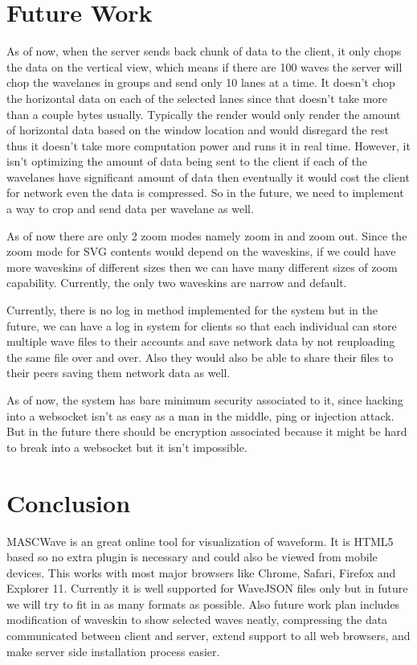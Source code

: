\documentclass[14pt]{extarticle}
\begin{document}
 \section{Future Work}
 \par As of now, when the server sends back chunk of data to the client, it only chops the data on the vertical view, which means if there are 100 waves the server will chop the wavelanes in groups and send only 10 lanes at a time. It doesn't chop the horizontal data on each of the selected lanes since that doesn't take more than a couple bytes usually. Typically the render would only render the amount of horizontal data based on the window location and would disregard the rest thus it doesn't take more computation power and runs it in real time. However, it isn't optimizing the amount of data being sent to the client if each of the wavelanes have significant amount of data then eventually it would cost the client for network even the data is compressed. So in the future, we need to implement a way to crop and send data per wavelane as well.
 \par As of now there are only 2 zoom modes namely zoom in and zoom out. Since the zoom mode for SVG contents would depend on the waveskins, if we could have more waveskins of different sizes then we can have many different sizes of zoom capability. Currently, the only two waveskins are narrow and default.
 \par Currently, there is no log in method implemented for the system but in the future, we can have a log in system for clients so that each individual can store multiple wave files to their accounts and save network data by not reuploading the same file over and over. Also they would also be able to share their files to their peers saving them network data as well.
 \par As of now, the system has bare minimum security associated to it, since hacking into a websocket isn't as easy as a man in the middle, ping or injection attack. But in the future there should be encryption associated because it might be hard to break into a websocket but it isn't impossible.
 
\newpage
\section{Conclusion}
 MASCWave is an great online tool for visualization of waveform. It is HTML5 based so no extra plugin is necessary and could also be viewed from mobile devices. This works with most major browsers like Chrome, Safari, Firefox and Explorer 11. Currently it is well supported for WaveJSON files only but in future we will try to fit in as many formats as possible. Also future work plan includes modification of waveskin to show selected waves neatly, compressing the data communicated between client and server, extend support to all web browsers, and make server side installation process easier.
\end{document}
